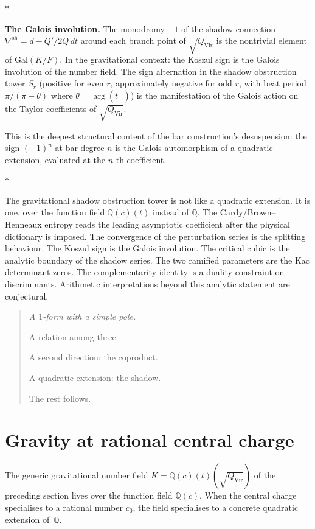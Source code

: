\documentclass[11pt]{article}
\newcommand{\Q}{\mathbb{Q}}
\newcommand{\sep}{\bigskip\begin{center}$*$\end{center}\medskip}
\begin{document}
\sep

\noindent\textbf{The Galois involution.}\enspace
The monodromy $-1$ of the shadow connection
$\nabla^{\mathrm{sh}} = d - Q'/2Q\,dt$ around each branch
point of $\sqrt{Q_{\mathrm{Vir}}}$ is the nontrivial element
of $\mathrm{Gal}(K/F)$.  In the gravitational context: the
Koszul sign is the Galois involution of the number field.  The
sign alternation in the shadow obstruction tower $S_r$ (positive for even
$r$, approximately negative for odd $r$, with beat period
$\pi/(\pi - \theta)$ where $\theta = \arg(t_+)$) is the
manifestation of the Galois action on the Taylor coefficients
of $\sqrt{Q_{\mathrm{Vir}}}$.

This is the deepest structural content of the bar
construction's desuspension: the sign $(-1)^n$ at bar degree
$n$ is the Galois automorphism of a quadratic extension,
evaluated at the $n$-th coefficient.

\sep

The gravitational shadow obstruction tower is not like a quadratic
extension.  It is one, over the function field $\Q(c)(t)$
instead of $\Q$.  The Cardy/Brown--Henneaux entropy reads the
leading asymptotic coefficient after the physical dictionary is
imposed.  The convergence of the perturbation series is the
splitting behaviour.  The Koszul sign is the Galois involution.
The critical cubic is the analytic boundary of the shadow series.
The two ramified parameters are the Kac determinant zeros.  The
complementarity identity is a duality constraint on discriminants.
Arithmetic interpretations beyond this analytic statement are
conjectural.

\begin{quote}\itshape
A $1$-form with a simple pole.

A relation among three.

A second direction: the coproduct.

A quadratic extension: the shadow.

The rest follows.
\end{quote}


\section{Gravity at rational central charge}
\label{sec:gravity-rational-c}

The generic gravitational number field
$K = \Q(c)(t)(\sqrt{Q_{\mathrm{Vir}}})$ of the preceding
section lives over the function field $\Q(c)$.  When the
central charge specialises to a rational number $c_0$, the
field specialises to a concrete quadratic extension of~$\Q$.
\end{document}
